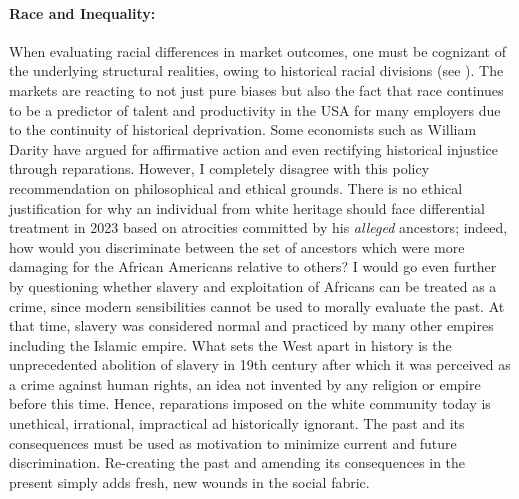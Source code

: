 \documentclass[12pt]{article}
\newcommand{\1}{\mathbbm 1}
\begin{document}
	    
	    
	    
	    
	    \paragraph{Race and Inequality:}
	    When evaluating racial differences in market outcomes, one must be cognizant of the underlying structural realities, owing to historical racial divisions (see \cite{darity2006economics}). The markets are reacting to not just pure biases but also the fact that race continues to be a predictor of talent and productivity in the USA for many employers due to the continuity of historical deprivation. Some economists such as William Darity have argued for affirmative action \cite{darity2005affirmative} and even rectifying historical injustice through reparations. However, I completely disagree with this policy recommendation on philosophical and ethical grounds. There is no ethical justification for why an individual from white heritage should face differential treatment in 2023 based on atrocities committed by his \textit{alleged} ancestors; indeed, how would you discriminate between the set of ancestors which were more damaging for the African Americans relative to others? I would go even further by questioning whether slavery and exploitation of Africans can be treated as a crime, since modern sensibilities cannot be used to morally evaluate the past. At that time, slavery was considered normal and practiced by many other empires including the Islamic empire. What sets the West apart in history is the unprecedented abolition of slavery in 19th century after which it was perceived as a crime against human rights, an idea not invented by any religion or empire before this time. Hence, reparations imposed on the white community today is unethical, irrational, impractical ad historically ignorant. The past and its consequences must be used as motivation to minimize current and future discrimination. Re-creating the past and amending its consequences in the present simply adds fresh, new wounds in the social fabric.
	    
	    
	    
	    
	    
\end{document}
